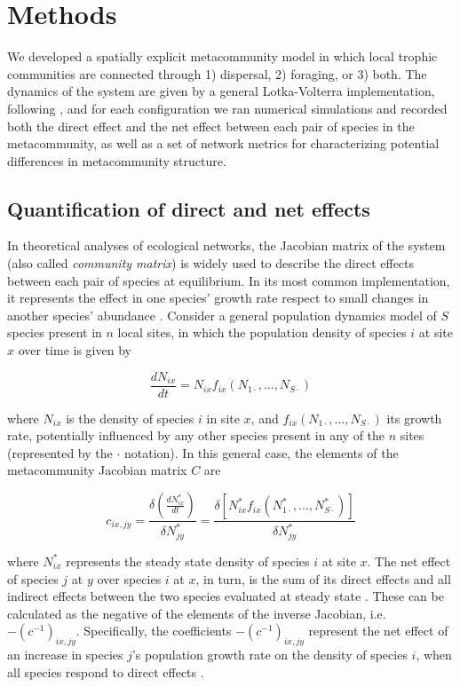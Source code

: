 \section{Methods}

We developed a spatially explicit metacommunity model in which local trophic communities are connected through 1) dispersal, 2) foraging, or 3) both. The dynamics of the system are given by a general Lotka-Volterra implementation, following \cite{Gravel2016a}, and for each configuration we ran numerical simulations and recorded both the direct effect and the net effect between each pair of species in the metacommunity, as well as a set of network metrics for characterizing potential differences in metacommunity structure.

\subsection*{Quantification of direct and net effects}
In theoretical analyses of ecological networks, the Jacobian matrix of the system (also called \textit{community matrix}) is widely used to describe the direct effects between each pair of species at equilibrium. In its most common implementation, it represents the effect in one species' growth rate respect to small changes in another species' abundance \citep{Berlow2004, Novak2016}. Consider a general population dynamics model of $S$ species present in $n$ local sites, in which the population density of species $i$ at site $x$ over time is given by

\begin{equation}
\frac{dN_{ix}}{dt} = N_{ix} f_{ix}(N_{1\cdot},...,N_{S\cdot})
\end{equation}

where $N_{ix}$ is the density of species $i$ in site $x$, and $f_{ix}(N_{1\cdot},...,N_{S\cdot})$ its growth rate, potentially influenced by any other species present in any of the $n$ sites (represented by the $\cdot$ notation). In this general case, the elements of the metacommunity Jacobian matrix $C$ are

\begin{equation}
c_{ix,jy} = \frac{\delta (\frac{dN_{ix}^*}{dt})}{\delta N_{jy}^*} = \frac{\delta [N_{ix}^* f_{ix}(N_{1\cdot}^*,...,N_{S\cdot}^*)]}{\delta N_{jy}^*}
\end{equation}

where $N_{ix}^*$ represents the steady state density of species $i$ at site $x$. The net effect of species $j$ at $y$ over species $i$ at $x$, in turn, is the sum of its direct effects and all indirect effects between the two species evaluated at steady state \citep{Bender1984,Montoya2009a,Novak2016}. These can be calculated as the negative of the elements of the inverse Jacobian, i.e. $-(c^{-1})_{ix,jy}$. Specifically, the coefficients $-(c^{-1})_{ix,jy}$ represent the net effect of an increase in species $j$'s population growth rate on the density of species $i$, when all species respond to direct effects \citep{Novak2016}.

